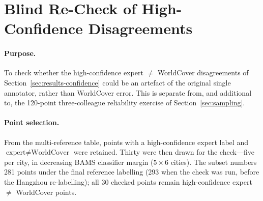 \documentclass[remotesensing,article,submit,moreauthors]{Definitions/mdpi}
\begin{document}

\section{Blind Re-Check of High-Confidence Disagreements}\label{app:recheck}

\paragraph{Purpose.} To check whether the high-confidence expert $\neq$
WorldCover disagreements of Section~\ref{sec:results-confidence} could be an
artefact of the original single annotator, rather than WorldCover error. This
is separate from, and additional to, the 120-point three-colleague reliability
exercise of Section~\ref{sec:sampling}.

\paragraph{Point selection.} From the multi-reference table, points with a
high-confidence expert label and $\text{expert} \neq \text{WorldCover}$ were
retained. Thirty were then drawn for the check---five per city, in decreasing
BAMS classifier margin ($5 \times 6$ cities). The subset numbers 281 points
under the final reference labelling (293 when the check was run, before the
Hangzhou re-labelling); all 30 checked points remain high-confidence
expert $\neq$ WorldCover points.
\end{document}
